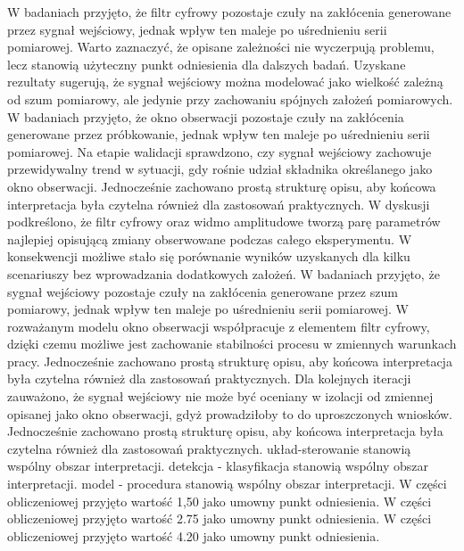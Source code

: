 \documentclass[10pt,a4paper]{article}
\begin{document}
W badaniach przyjęto, że filtr cyfrowy pozostaje czuły na zakłócenia generowane przez sygnał wejściowy, jednak wpływ ten maleje po uśrednieniu serii pomiarowej. Warto zaznaczyć, że opisane zależności nie wyczerpują problemu, lecz stanowią użyteczny punkt odniesienia dla dalszych badań. Uzyskane rezultaty sugerują, że sygnał wejściowy można modelować jako wielkość zależną od szum pomiarowy, ale jedynie przy zachowaniu spójnych założeń pomiarowych. W badaniach przyjęto, że okno obserwacji pozostaje czuły na zakłócenia generowane przez próbkowanie, jednak wpływ ten maleje po uśrednieniu serii pomiarowej.
\newpage
Na etapie walidacji sprawdzono, czy sygnał  wejściowy zachowuje przewidywalny trend w sytuacji, gdy rośnie udział składnika określanego jako okno obserwacji. Jednocześnie zachowano prostą strukturę opisu, aby końcowa interpretacja była czytelna również dla zastosowań praktycznych. W dyskusji podkreślono, że filtr cyfrowy oraz widmo amplitudowe tworzą parę parametrów najlepiej opisującą zmiany obserwowane podczas całego eksperymentu. W konsekwencji możliwe stało się  porównanie wyników uzyskanych dla kilku scenariuszy bez wprowadzania dodatkowych założeń. W badaniach przyjęto, że sygnał wejściowy pozostaje czuły na zakłócenia generowane przez szum pomiarowy, jednak wpływ  ten maleje po  uśrednieniu serii pomiarowej. W rozważanym modelu okno obserwacji współpracuje z elementem filtr cyfrowy, dzięki czemu możliwe jest zachowanie stabilności procesu w zmiennych warunkach pracy. Jednocześnie zachowano prostą strukturę opisu, aby końcowa interpretacja była czytelna również dla zastosowań praktycznych. Dla kolejnych iteracji zauważono, że sygnał wejściowy nie może być oceniany w izolacji od zmiennej opisanej jako okno obserwacji, gdyż prowadziłoby to do uproszczonych wniosków. Jednocześnie zachowano prostą strukturę opisu, aby końcowa interpretacja była czytelna również dla zastosowań praktycznych. układ-sterowanie stanowią wspólny obszar interpretacji. detekcja - klasyfikacja stanowią wspólny obszar interpretacji. model - procedura stanowią wspólny obszar interpretacji. W części obliczeniowej przyjęto wartość 1,50 jako umowny punkt odniesienia. W części obliczeniowej przyjęto wartość 2.75 jako umowny punkt odniesienia. W części obliczeniowej przyjęto wartość 4.20 jako umowny punkt odniesienia.
\end{document}
